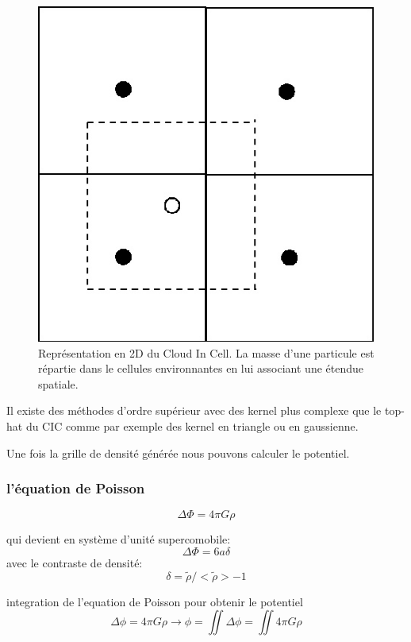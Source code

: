 \begin{figure}[bth]
		\centering
        \includegraphics[width=.5\linewidth]{img/02/CIC.jpg} 
        \caption{Représentation en 2D du Cloud In Cell. 
        La masse d'une particule est répartie dans le cellules environnantes en lui associant une étendue spatiale.
}
 		\label{fig:CIC}
\end{figure}

Il existe des méthodes d'ordre supérieur avec des kernel plus complexe que le top-hat du CIC comme par exemple des kernel en triangle ou en gaussienne.

Une fois la grille de densité générée nous pouvons calculer le potentiel.

\subsubsection{l'équation de Poisson}
\begin{equation}
\Delta \Phi = 4 \pi G \rho
\end{equation}

qui devient en système d'unité supercomobile:
\begin{equation}
\Delta \Phi = 6 a \delta
\end{equation}
avec le contraste de densité: 
\begin{equation}
\delta = \tilde{\rho} / < \tilde{\rho} > - 1 
\end{equation}

integration de l'equation de Poisson pour obtenir le potentiel
\begin{equation}
\Delta \phi = 4\pi G \rho \longrightarrow \phi = \iint \Delta \phi = \iint 4\pi G \rho
\end{equation}

